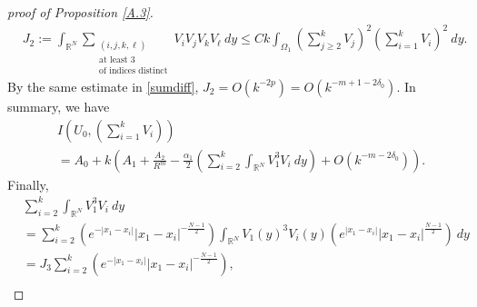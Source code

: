 \documentclass{amsart}
\theoremstyle{definition}
\theoremstyle{remark}
\numberwithin{equation}{section}
\begin{document}
\begin{proof}[proof of Proposition \ref{A.3}]
\begin{align*}
&J_2:=\int_{\mathbb{R}^N} \sum_{\substack{(i,j,k,\ell)\\ \text{at least 3} \\ \text{of indices distinct}} }V_iV_j V_k V_\ell\:dy \le Ck \int_{\Omega_1}  \left( \sum_{j\ge 2}^k V_j \right)^2 \left(\sum_{i=1}^k V_i\right)^2 \:dy.
\end{align*}
%
%
By the same estimate in \eqref{sumdiff}, $J_2 = O(k^{-2p}) = O(k^{-m+1-2\delta_0})$. In summary,  we have
\begin{equation}
\begin{aligned}\label{f5}
&I\left(U_0, \left( \sum_{i=1}^k V_{i}\right)\right)  
\\& = A_0+ 
 k\left(A_1+\frac{A_2}{R^{m}}-\frac{\alpha_1}{2} \left( \sum_{i=2}^{k} \int_{\mathbb{R}^{N}} V_1^{3} V_i\:dy\right) + O\left(k^{-m-2\delta_0}\right)\right) .
\end{aligned}
\end{equation}
Finally,
\begin{align*}
&\sum_{i=2}^{k} \int_{\mathbb{R}^{N}} V_1^{3} V_i\:dy\\
& = \sum_{i=2}^{k} \left(e^{-\left|x_{1}-x_{i}\right|}|x_1-x_i|^{-\frac{N-1}{2}}\right) \int_{\mathbb{R}^{N}} V_1(y)^{3} V_i(y) \left(e^{\left|x_{1}-x_{i}\right|}|x_1-x_i|^{\frac{N-1}{2}}\right) \:dy\\
&= J_3\sum_{i=2}^{k} \left(e^{-\left|x_{1}-x_{i}\right|}|x_1-x_i|^{-\frac{N-1}{2}}\right),\\

\end{align*}
\end{proof}
\end{document}
